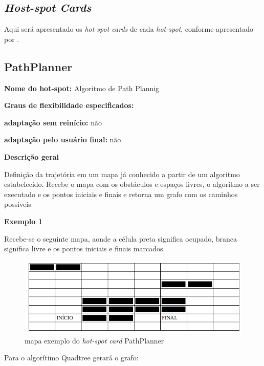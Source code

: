 \begin{anexosenv}

\partanexos

\chapter{\textit{Host-spot Cards}}

Aqui será apresentado os \textit{hot-spot cards} de cada \textit{hot-spot}, conforme apresentado por \cite{Fayad1999}.

\section{PathPlanner}

{\large \textbf{Nome do hot-spot:}} Algoritmo de Path Plannig

{\large \textbf{Graus de flexibilidade especificados:}}

\textbf{adaptação sem reinício:} não

\textbf{adaptação pelo usuário final:} não

{\large \textbf{Descrição geral}}

Definição da trajetória em um mapa já conhecido a partir de um algoritmo estabelecido. Recebe o mapa com os obstáculos e espaços livres, o algoritmo a ser executado e os pontos iniciais e finais e retorna um grafo com os caminhos possíveis

{\large \textbf{Exemplo 1}}

Recebe-se o seguinte mapa, aonde a célula preta significa ocupado, branca significa livre e os pontos iniciais e finais marcados.

\begin{figure}[h]
	\centering
	\label{figXX}
		\includegraphics[keepaspectratio=true,scale=0.7]{figuras/mapahotspot1.PNG}
	\caption{mapa exemplo do \textit{hot-spot card} PathPlanner}
\end{figure}

Para o algorítimo Quadtree gerará o grafo:


\end{anexosenv}
